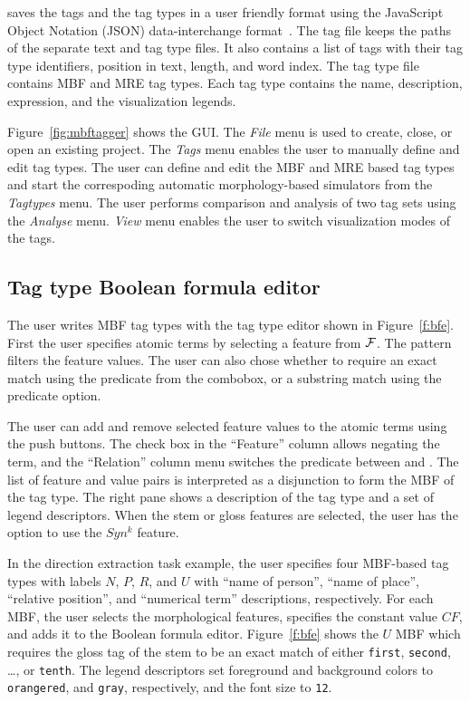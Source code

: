 \framework saves the tags and the tag types in a user friendly format using
the JavaScript Object Notation (JSON) data-interchange 
format~\cite{nolan2014javascript}.
The tag file keeps the paths of the separate text and tag type files. 
It also contains a list of tags with their tag type identifiers,
position in text, length, and word index.
The tag type file contains MBF and MRE tag types. 
Each tag type contains the name, description, expression, and the visualization legends.

Figure~\ref{fig:mbftagger} shows the \framework GUI. 
The {\em File} menu is used to create, close, or open an existing project. 
The {\em Tags} menu enables the user to manually define and edit tag types. 
The user can define and edit the MBF and MRE based tag types and 
start the correspoding automatic morphology-based simulators from the {\em Tagtypes} menu. 
The user performs comparison and analysis of two tag sets using the {\em Analyse} menu. 
{\em View} menu enables the user to switch visualization modes of the tags. 

\subsection{Tag type Boolean formula editor}
The user writes MBF tag types with the tag type editor shown in Figure~\ref{f:bfe}.
First the user specifies atomic terms by selecting a feature from ${\cal F}$. 
The pattern filters the feature values.
The user can also chose whether to require an exact match using the
 predicate from the combobox, or a substring match using the
 predicate option.

The user can add and remove selected feature values to the atomic terms 
using the push buttons. 
The check box in the ``Feature'' column allows negating the term, and the
``Relation'' column menu switches the predicate between 
 and . 
The list of feature and value pairs is interpreted as a disjunction to form
the MBF of the tag type. 
The right pane shows a description of the tag type and a set of legend 
descriptors. 
When the stem or gloss features are selected, the user has the option to 
use the $Syn^k$ feature. 

In the direction extraction task example, the user specifies four MBF-based 
tag types with labels 
$N$, $P$, $R$, and $U$ with  ``name of person'', ``name of place'', 
``relative position'', and ``numerical term'' descriptions, respectively. 
For each MBF, the user selects the morphological features, 
specifies the constant value $CF$, and adds it to the Boolean formula editor. 
%
Figure~\ref{f:bfe} shows the $U$ MBF which requires the gloss tag of 
the stem to be an exact match of either {\tt first}, {\tt second}, \dots, or {\tt tenth}. 
The legend descriptors set foreground and background colors to {\tt orangered}, 
and {\tt gray}, respectively, and the font size to {\tt 12}.

